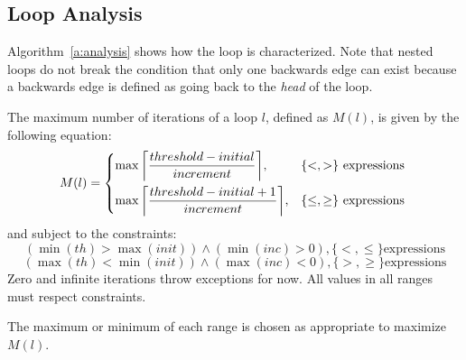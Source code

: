\subsection{Loop Analysis}

Algorithm~\ref{a:analysis} shows how the loop is characterized. Note that nested loops do not break the condition that only one backwards edge can exist because a backwards edge is defined as going back to the \textit{head} of the loop. 

The maximum number of iterations of a loop $l$, defined as $M(l)$, is given by the following equation:
\begin{equation}
	M(l) = 
	\begin{dcases*}
		\max{\left \lceil \frac{threshold - initial}{increment} \right \rceil}, & $\{<,>\}$ expressions \\
		\max{\left \lceil \frac{threshold - initial + 1}{increment} \right \rceil}, & $\{\leq,\geq\}$ expressions
	\end{dcases*}
	\label{eq:max}
\end{equation}
and subject to the constraints:
\begin{equation}
(\min(th) > \max(init)) \wedge (\min(inc) > 0), \{<,\leq\} \text{expressions} 
\end{equation}
\begin{equation}
(\max(th) < \min(init)) \wedge (\max(inc) < 0), \{>,\geq\} \text{expressions} 
\end{equation}
Zero and infinite iterations throw exceptions for now. All values in all ranges must respect constraints.
		
The maximum or minimum of each range is chosen as appropriate to maximize $M(l)$.	

